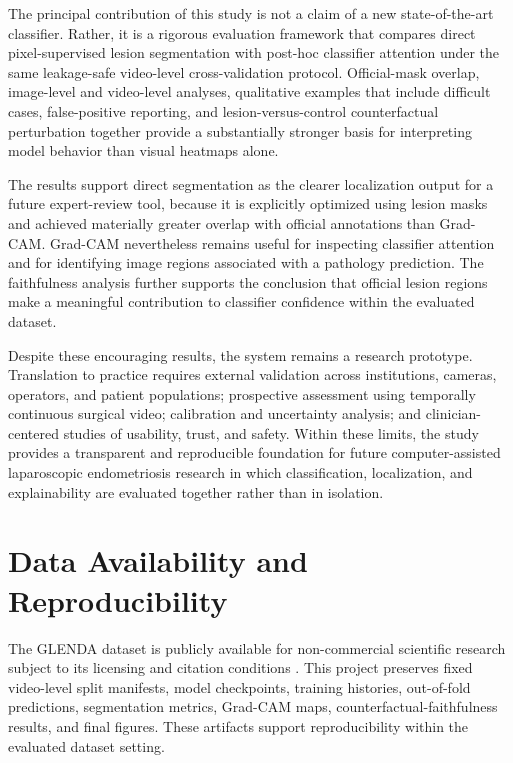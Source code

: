 The principal contribution of this study is not a claim of a new state-of-the-art classifier. Rather, it is a rigorous evaluation framework that compares direct pixel-supervised lesion segmentation with post-hoc classifier attention under the same leakage-safe video-level cross-validation protocol. Official-mask overlap, image-level and video-level analyses, qualitative examples that include difficult cases, false-positive reporting, and lesion-versus-control counterfactual perturbation together provide a substantially stronger basis for interpreting model behavior than visual heatmaps alone.

The results support direct segmentation as the clearer localization output for a future expert-review tool, because it is explicitly optimized using lesion masks and achieved materially greater overlap with official annotations than Grad-CAM. Grad-CAM nevertheless remains useful for inspecting classifier attention and for identifying image regions associated with a pathology prediction. The faithfulness analysis further supports the conclusion that official lesion regions make a meaningful contribution to classifier confidence within the evaluated dataset.

Despite these encouraging results, the system remains a research prototype. Translation to practice requires external validation across institutions, cameras, operators, and patient populations; prospective assessment using temporally continuous surgical video; calibration and uncertainty analysis; and clinician-centered studies of usability, trust, and safety. Within these limits, the study provides a transparent and reproducible foundation for future computer-assisted laparoscopic endometriosis research in which classification, localization, and explainability are evaluated together rather than in isolation.

\section*{Data Availability and Reproducibility}

The GLENDA dataset is publicly available for non-commercial scientific research subject to its licensing and citation conditions \cite{leibetseder2020glenda}. This project preserves fixed video-level split manifests, model checkpoints, training histories, out-of-fold predictions, segmentation metrics, Grad-CAM maps, counterfactual-faithfulness results, and final figures. These artifacts support reproducibility within the evaluated dataset setting.

